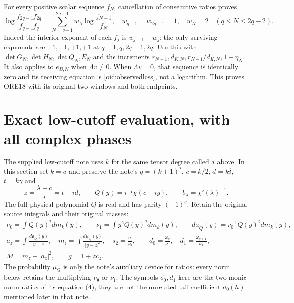 \documentclass[11pt,a4paper]{article}
\begin{document}
For every positive scalar sequence $f_N$, cancellation of consecutive
ratios proves
\begin{equation}\label{oid:windows}
 \log\frac{f_{2q-1}f_{2q}}{f_{q-1}f_q}
 =\sum_{N=q-1}^{2q-1}w_N\log\frac{f_{N+1}}{f_N},\quad
 w_{q-1}=w_{2q-1}=1,\quad w_N=2\quad(q\le N\le2q-2).
\end{equation}
Indeed the interior exponent of each $f_j$ is $w_{j-1}-w_j$;
the only surviving exponents are $-1,-1,+1,+1$ at
$q-1,q,2q-1,2q$. Use this with $\det G_N,\det H_N,\det Q_N,E_N$
and the increments $r_{N+1},d_{K,N},r_{N+1}/d_{K,N},1-\eta_N$.
It also applies to $e_{B,N}$ when $\Lambda v\ne0$. When
$\Lambda v=0$, that sequence is identically zero and its receiving
equation is \eqref{oid:observedloss}, not a logarithm. This proves
ORE18 with its original two windows and both endpoints.

\section{Exact low-cutoff evaluation, with all complex phases}

The supplied low-cutoff note uses $k$ for the same tensor degree
called $a$ above. In this section set $k=a$ and preserve the note's
$q=(k+1)^2$, $c=k/2$, $d=k\delta$, $t=k\gamma$ and
\[
 z=\frac{\lambda-c}{i}=t-id,\qquad
 Q(y)=i^{-q}\chi(c+iy),\qquad b_\lambda=\chi'(\lambda)^{-1}.
\]
The full physical polynomial $Q$ is real and has parity $(-1)^q$.
Retain the original source integrals and their original masses:
\begin{equation}\label{oid:moments}
\begin{gathered}
 \nu_0=\int Q(y)^2dm_k(y),\qquad
 \nu_1=\int y^2Q(y)^2dm_k(y),\qquad
 d\mu_Q(y)=\nu_0^{-1}Q(y)^2dm_k(y),\\
 a_z=\int\frac{d\mu_Q(y)}{y-z},\quad
 m_z=\int\frac{d\mu_Q(y)}{|y-z|^2},\quad
 s_2=\frac{\nu_1}{\nu_0},\qquad
 d_0=\frac{\omega_q}{\nu_0},\quad
 d_1=\frac{\omega_{q+1}}{\nu_1},\\
 M=m_z-|a_z|^2,\qquad g=1+za_z.
\end{gathered}
\end{equation}
The probability $\mu_Q$ is only the note's auxiliary device for
ratios: every norm below retains the multiplying $\nu_0$ or $\nu_1$.
The symbols $d_0,d_1$ here are the two monic norm ratios of its
equation (4); they are not the unrelated tail coefficient $d_0(h)$
mentioned later in that note.
\end{document}

